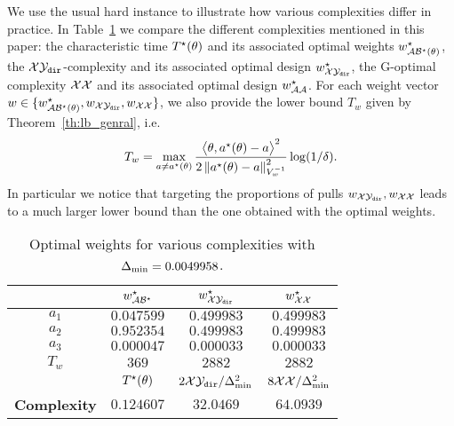 We use the usual hard instance to illustrate how various complexities differ in practice. In Table~\ref{table:optimal_weights} we compare the different complexities mentioned in this paper: the characteristic time $T^{\star}(\theta)$ and its associated optimal weights $w^\star_{\mathcal{A}\mathcal{B}^\star(\theta)}$, the $\mathcal{X}\mathcal{Y}_{\texttt{dir}}$-complexity and its associated optimal design $w^\star_{\mathcal{X}\mathcal{Y}_{\texttt{dir}}}$, the G-optimal complexity $\mathcal{X}\mathcal{X}$ and its associated optimal design $w^\star_{\mathcal{A}\mathcal{A}}$. For each weight vector $w \in\{w^\star_{\mathcal{A}\mathcal{B}^\star(\theta)},w_{\mathcal{X}\mathcal{Y}_{\texttt{dir}}}, w_{\mathcal{X}\mathcal{X}}\}$,
 we also provide the lower bound $T_w$ given by Theorem~\ref{th:lb_genral}, i.e.
 \[
 T_w = \max_{a\neq a^\star(\theta)} \frac{\big\langle \theta, a^\star(\theta)-a\big\rangle^2}{2\left\lVert a^\star(\theta)-a\right\rVert_{V_w^{-1}}^2} \log(1/\delta).
\]
In particular we notice that targeting the proportions of pulls $w_{\mathcal{X}\mathcal{Y}_{\texttt{dir}}}, w_{\mathcal{X}\mathcal{X}}$ leads to a much larger lower bound than the one obtained with the optimal weights.
\begin{table}[t!]
\centering
\begin{tabular}{|c|c|c|c|}
 \hline
   & $w^\star_{\mathcal{A}\mathcal{B}^\star}$ & $w^\star_{\mathcal{X}\mathcal{Y}_{\texttt{dir}}}$  & $w^\star_{\mathcal{X}\mathcal{X}}$   \\
 \hline
 \textbf{$a_1$} & $0.047599$ & $0.499983$ & $0.499983$ \\
 \hline
 \textbf{$a_2$} & $0.952354$ & $0.499983$ & $0.499983$ \\
 \hline
 \textbf{$a_3$} & $0.000047$ & $0.000033$ & $0.000033$ \\
 \hline
 \textbf{$T_w$} & $369$ & $2882$ & $2882$ \\
 \hline
   & $T^{\star}(\theta)$ & $2\mathcal{X}\mathcal{Y}_{\texttt{dir}}/\Delta_\text{min}^2$ & $8\mathcal{X}\mathcal{X}/\Delta_\text{min}^2$\\
 \hline
  \textbf{Complexity} & $0.124607$ & $32.0469$ & $64.0939$ \\
 \hline
\end{tabular}
\caption{Optimal weights for various complexities with $\Delta_\text{min}= 0.0049958$.}
\label{table:optimal_weights}
\end{table}


